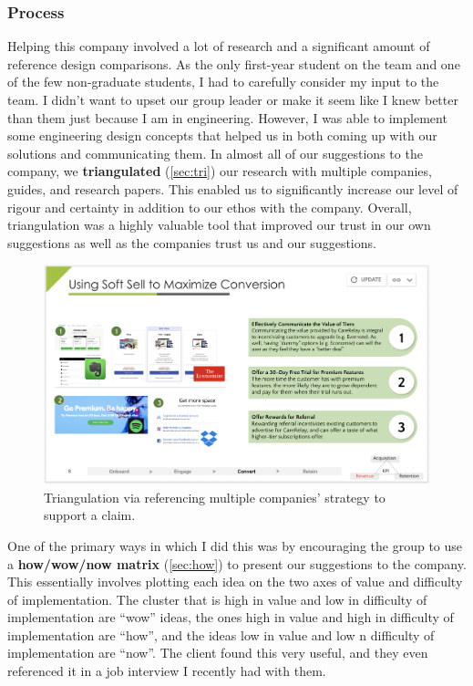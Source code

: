 \documentclass[a4paper,12pt]{article}
\begin{document}
\subsubsection{Process}
Helping this company involved a lot of research and a significant amount of reference design comparisons. As the only first-year student on the team and one of the few non-graduate students, I had to carefully consider my input to the team. I didn’t want to upset our group leader or make it seem like I knew better than them just because I am in engineering. However, I was able to implement some engineering design concepts that helped us in both coming up with our solutions and communicating them.
In almost all of our suggestions to the company, we \textbf{triangulated} (\ref{sec:tri}) our research with multiple companies, guides, and research papers. This enabled us to significantly increase our level of rigour and certainty in addition to our ethos with the company. Overall, triangulation was a highly valuable tool that improved our trust in our own suggestions as well as the companies trust us and our suggestions.

\begin{figure}[H]
\centering
\includegraphics[width=1\textwidth]{img/image010.png}
\caption{Triangulation via referencing multiple companies' strategy to support a claim.}
\label{}
\end{figure}

One of the primary ways in which I did this was by encouraging the group to use a \textbf{how/wow/now matrix} (\ref{sec:how}) to present our suggestions to the company. This essentially involves plotting each idea on the two axes of value and difficulty of implementation. The cluster that is high in value and low in difficulty of implementation are “wow” ideas, the ones high in value and high in difficulty of implementation are “how”, and the ideas low in value and low n difficulty of implementation are “now”. The client found this very useful, and they even referenced it in a job interview I recently had with them.
\end{document}
